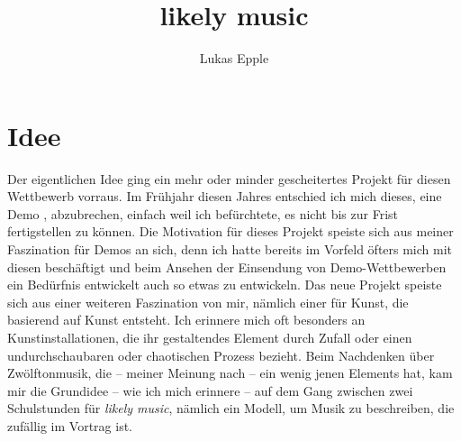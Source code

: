 \documentclass[a4paper,twocolumn]{article}
\title{likely music}
\author{Lukas Epple}
\begin{document}


\section*{Idee}

Der eigentlichen Idee ging ein mehr oder minder gescheitertes Projekt für diesen
Wettbewerb vorraus. Im Frühjahr diesen Jahres entschied ich mich dieses, eine
Demo \cite{wikipedia_demoscene}, abzubrechen, einfach weil ich befürchtete, es nicht bis zur Frist
fertigstellen zu können. Die Motivation für dieses Projekt speiste sich aus
meiner Faszination für Demos an sich, denn ich hatte bereits im Vorfeld öfters
mich mit diesen beschäftigt und beim Ansehen der Einsendung von
Demo-Wettbewerben ein Bedürfnis entwickelt auch so etwas zu entwickeln. Das neue
Projekt speiste sich aus einer weiteren Faszination von mir, nämlich einer für
Kunst, die basierend auf Kunst entsteht. Ich erinnere mich oft besonders an
Kunstinstallationen, die ihr gestaltendes Element durch Zufall oder einen
undurchschaubaren oder chaotischen Prozess bezieht. Beim Nachdenken über
Zwölftonmusik, die -- meiner Meinung nach -- ein wenig jenen Elements hat, kam
mir die Grundidee -- wie ich mich erinnere -- auf dem Gang zwischen
zwei Schulstunden für {\it likely music}, nämlich ein Modell, um Musik zu
beschreiben, die zufällig im Vortrag ist.
\end{document}
